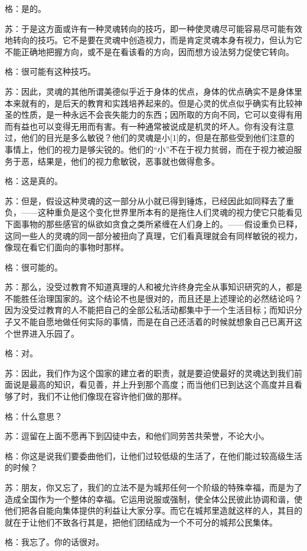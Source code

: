 \documentclass[12pt,oneside]{book}
\begin{document}
格：是的。

苏：于是这方面或许有一种灵魂转向的技巧，即一种使灵魂尽可能容易尽可能有效地转向的技巧。它不是要在灵魂中创造视力，而是肯定灵魂本身有视力，但认为它不能正确地把握方向，或不是在看该看的方向，因而想方设法努力促使它转向。

格：很可能有这种技巧。

苏：因此，灵魂的其他所谓美德似乎近于身体的优点，身体的优点确实不是身体里本来就有的，是后天的教育和实践培养起来的。但是心灵的优点似乎确实有比较神圣的性质，是一种永远不会丧失能力的东西；因所取的方向不同，它可以变得有用而有益也可以变得无用而有害。有一种通常被说成是机灵的坏人。你有没有注意过，他们的目光是多么敏锐？他们的灵魂是小[1]的，但是在那些受到他们注意的事情上，他们的视力是够尖锐的。他们的“小”不在于视力贫弱，而在于视力被迫服务于恶，结果是，他们的视力愈敏锐，恶事就也做得愈多。

格：这是真的。

苏：但是，假设这种灵魂的这一部分从小就已得到锤炼，已经因此如同释去了重负，——这种重负是这个变化世界里所本有的是拖住人们灵魂的视力使它只能看见下面事物的那些感官的纵欲如贪食之类所紧缠在人们身上的。——假设重负已释，这同一些人的灵魂的同一部分被扭向了真理，它们看真理就会有同样敏锐的视力，像现在看它们面向的事物时那样。

格：很可能的。

苏：那么，没受过教育不知道真理的人和被允许终身完全从事知识研究的人，都是不能胜任治理国家的。这个结论不也是很对的，而且还是上述理论的必然结论吗？因为没受过教育的人不能把自己的全部公私活动都集中于一个生活目标；而知识分子又不能自愿地做任何实际的事情，而是在自己还活着的时候就想象自己已离开这个世界进入乐园了。

格：对。

苏：因此，我们作为这个国家的建立者的职责，就是要迫使最好的灵魂达到我们前面说是最高的知识，看见善，并上升到那个高度；而当他们已到达这个高度并且看够了时，我们不让他们像现在容许他们做的那样。

格：什么意思？

苏：逗留在上面不愿再下到囚徒中去，和他们同劳苦共荣誉，不论大小。

格：你这是说我们要委曲他们，让他们过较低级的生活了，在他们能过较高级生活的时候？

苏：朋友，你又忘了，我们的立法不是为城邦任何一个阶级的特殊幸福，而是为了造成全国作为一个整体的幸福。它运用说服或强制，使全体公民彼此协调和谐，使他们把各自能向集体提供的利益让大家分享。而它在城邦里造就这样的人，其目的就在于让他们不致各行其是，把他们团结成为一个不可分的城邦公民集体。

格：我忘了。你的话很对。
\end{document}
